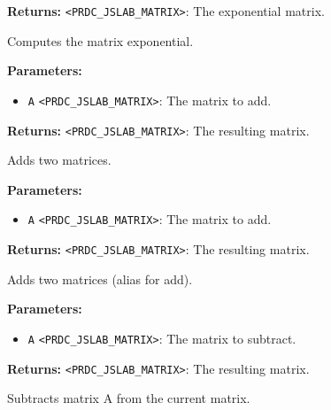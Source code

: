 \documentclass[12pt,a4paper]{article}
\begin{document}
\noindent \textbf{Returns:} \texttt{<PRDC\_JSLAB\_MATRIX>}: The exponential matrix.

\noindent Computes the matrix exponential.

\vspace{5mm}
\noindent {}


\noindent \textbf{Parameters:}
\begin{itemize}
  \item \texttt{A} \texttt{<PRDC\_JSLAB\_MATRIX>}: The matrix to add.
\end{itemize}

\noindent \textbf{Returns:} \texttt{<PRDC\_JSLAB\_MATRIX>}: The resulting matrix.

\noindent Adds two matrices.

\vspace{5mm}
\noindent {}


\noindent \textbf{Parameters:}
\begin{itemize}
  \item \texttt{A} \texttt{<PRDC\_JSLAB\_MATRIX>}: The matrix to add.
\end{itemize}

\noindent \textbf{Returns:} \texttt{<PRDC\_JSLAB\_MATRIX>}: The resulting matrix.

\noindent Adds two matrices (alias for add).

\vspace{5mm}
\noindent {}


\noindent \textbf{Parameters:}
\begin{itemize}
  \item \texttt{A} \texttt{<PRDC\_JSLAB\_MATRIX>}: The matrix to subtract.
\end{itemize}

\noindent \textbf{Returns:} \texttt{<PRDC\_JSLAB\_MATRIX>}: The resulting matrix.

\noindent Subtracts matrix A from the current matrix.

\vspace{5mm}
\noindent {}
\end{document}
